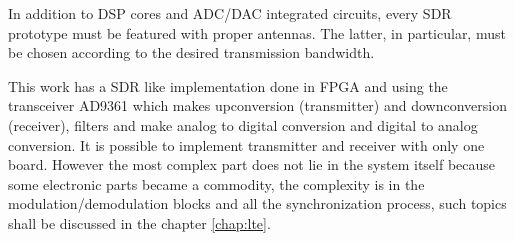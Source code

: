 In addition to DSP cores and ADC/DAC integrated circuits, every SDR prototype
must be featured with proper antennas. The latter, in particular, must be
chosen according to the desired transmission bandwidth.

This work has a SDR like implementation done in FPGA and using the transceiver
AD9361 which makes upconversion (transmitter) and downconversion
(receiver), filters and make analog to digital conversion and digital to analog
conversion. It is possible to implement transmitter and receiver with only
one board. However the most complex part does not lie in the system itself
because some electronic parts became a commodity, the complexity is in the
modulation/demodulation blocks and all the synchronization process, such topics
shall be discussed in the chapter \ref{chap:lte}.

